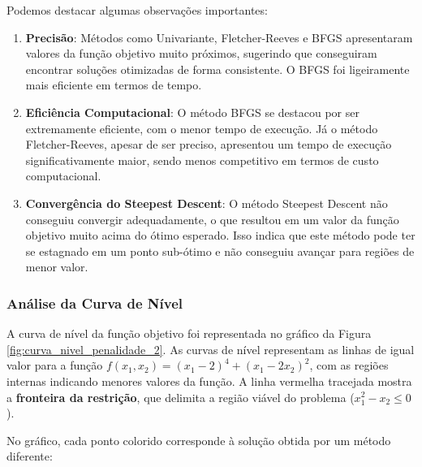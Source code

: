 \documentclass[a4paper, 12pt]{article}
\begin{document}
Podemos destacar algumas observações importantes:

\begin{enumerate}
    \item \textbf{Precisão}: Métodos como Univariante, Fletcher-Reeves e BFGS apresentaram valores da função objetivo muito próximos, sugerindo que conseguiram encontrar soluções otimizadas de forma consistente. O BFGS foi ligeiramente mais eficiente em termos de tempo.
    
    \item \textbf{Eficiência Computacional}: O método BFGS se destacou por ser extremamente eficiente, com o menor tempo de execução. Já o método Fletcher-Reeves, apesar de ser preciso, apresentou um tempo de execução significativamente maior, sendo menos competitivo em termos de custo computacional.

    \item \textbf{Convergência do Steepest Descent}: O método Steepest Descent não conseguiu convergir adequadamente, o que resultou em um valor da função objetivo muito acima do ótimo esperado. Isso indica que este método pode ter se estagnado em um ponto sub-ótimo e não conseguiu avançar para regiões de menor valor.
\end{enumerate}

\subsubsection{Análise da Curva de Nível}

A curva de nível da função objetivo foi representada no gráfico da Figura \ref{fig:curva_nivel_penalidade_2}. As curvas de nível representam as linhas de igual valor para a função \( f(x_1, x_2) = (x_1 - 2)^4 + (x_1 - 2x_2)^2 \), com as regiões internas indicando menores valores da função. A linha vermelha tracejada mostra a \textbf{fronteira da restrição}, que delimita a região viável do problema (\(x_1^2 - x_2 \leq 0\)).

No gráfico, cada ponto colorido corresponde à solução obtida por um método diferente:
\end{document}
